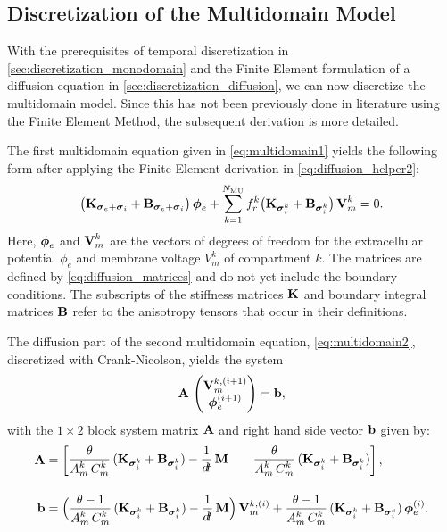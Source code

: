 \subsection{Discretization of the Multidomain Model}\label{sec:discretization_multidomain}
With the prerequisites of temporal discretization in \cref{sec:discretization_monodomain} and the Finite Element formulation of a diffusion equation in \cref{sec:discretization_diffusion}, we can now discretize the multidomain model. Since this has not been previously done in literature using the Finite Element Method, the subsequent derivation is more detailed.

The first multidomain equation given in \cref{eq:multidomain1} yields the following form after applying the Finite Element derivation in \cref{eq:diffusion_helper2}:
%
\begin{align}\label{eq:multidomain_discretization_helper_multidomain1}
  \big(\textbf{K}_{\boldsymbol{\sigma}_e + \boldsymbol{\sigma}_i} + \textbf{B}_{\boldsymbol{\sigma}_e + \boldsymbol{\sigma}_i}\big)\,\boldsymbol{\phi}_{e} +  \displaystyle\sum\limits_{k=1}^{N_\text{MU}} f_r^k \big(\textbf{K}_{\boldsymbol{\sigma}_i^k} + \textbf{B}_{\boldsymbol{\sigma}_i^k}\big)\,\textbf{V}_m^k = 0.  
\end{align}
Here, $\boldsymbol{\phi}_{e}$ and $\textbf{V}_m^k$ are the vectors of degrees of freedom for the extracellular potential $\phi_e$ and membrane voltage $V_m^k$ of compartment $k$. The matrices are defined by \cref{eq:diffusion_matrices} and do not yet include the boundary conditions.
The subscripts of the stiffness matrices $\textbf{K}$ and boundary integral matrices $\textbf{B}$ refer to the anisotropy tensors that occur in their definitions.

The diffusion part of the second multidomain equation, \cref{eq:multidomain2}, discretized with Crank-Nicolson, yields the system%
\begin{align}\label{eq:multidomain_discretization_helper_multidomain2}
  \textbf{A}\,\left(\begin{matrix}\textbf{V}_m^{k,(i+1)}\\ \boldsymbol{\phi}_{e}^{(i+1)}\end{matrix}\right) = \textbf{b},  
\end{align}
%
with the $1 \times 2$ block system matrix $\textbf{A}$ and right hand side vector $\textbf{b}$ given by:%
\begin{subequations}\label{eq:multidomain_discretization_helper_multidomain3}
\begin{align}
   \bfA &= \matt{
      \dfrac{\theta}{A_m^k\,C_m^k}(\bfK_{\bfsigma_i^k} + \bfB_{\bfsigma_i^k}) -\dfrac{1}{\dt}\bfM & \quad
      \dfrac{\theta}{A_m^k\,C_m^k}(\bfK_{\bfsigma_i^k} + \bfB_{\bfsigma_i^k})
    }, \\[4mm]
    \bfb &= \Big( \dfrac{\theta-1}{A_m^k\,C_m^k}(\bfK_{\bfsigma_i^k} + \bfB_{\bfsigma_i^k}) - \dfrac{1}{\dt}\bfM\Big)\,\bfV_m^{k,(i)} 
      + \dfrac{\theta - 1}{A_m^k\,C_m^k}(\bfK_{\bfsigma_i^k} + \bfB_{\bfsigma_i^k})\,\bfphi_e^{(i)}.
\end{align}
\end{subequations}

